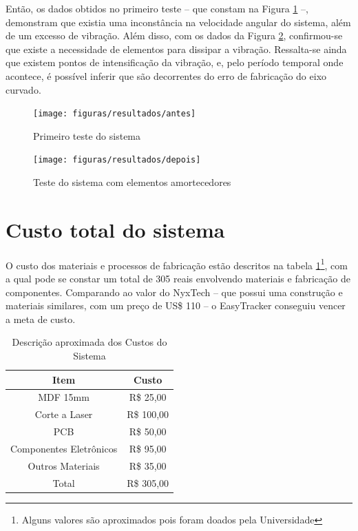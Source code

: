 Então, os dados obtidos no primeiro teste -- que constam na Figura \ref{fig:antes} --, demonstram que existia uma inconstância na velocidade angular do sistema, além de um excesso de vibração. Além disso, com os dados da Figura \ref{fig:depois}, confirmou-se que existe a necessidade de elementos para dissipar a vibração. Ressalta-se ainda que existem pontos de intensificação da vibração, e, pelo período temporal onde acontece, é possível inferir que são decorrentes do erro de fabricação do eixo curvado. 

\begin{figure}[!htb]
	\centering
	\caption{Primeiro teste do sistema}
	\texttt{[image: figuras/resultados/antes]}
	\label{fig:antes}
\end{figure}

\begin{figure}[!htb]
	\centering
	\caption{Teste do sistema com elementos amortecedores}
	\texttt{[image: figuras/resultados/depois]}
	\label{fig:depois}
\end{figure}

\section{Custo total do sistema}
O custo dos materiais e processos de fabricação estão descritos na tabela \ref{table:custo}\footnote{Alguns valores são aproximados pois foram doados pela Universidade}, com a qual pode se constar um total de 305 reais envolvendo materiais e fabricação de componentes. Comparando ao valor do NyxTech -- que possui uma construção e materiais similares, com um preço de US\$ 110 -- o EasyTracker conseguiu vencer a meta de custo.  

\begin{table}[!htb]
	\centering
	\caption{Descrição aproximada dos Custos do Sistema}
	\begin{tabular}{c|c}
	Item	&	Custo	\\\hline\hline
	MDF	15mm	&	R\$ 25,00		\\\hline
	Corte a Laser			&	R\$ 100,00		\\\hline
	PCB			&	R\$ 50,00		\\\hline
	Componentes Eletrônicos			&	R\$ 95,00		\\\hline
	Outros Materiais		&	R\$ 35,00		\\\hline\hline
	Total			&	R\$ 305,00		\\
	\end{tabular}
	\label{table:custo}
\end{table}



